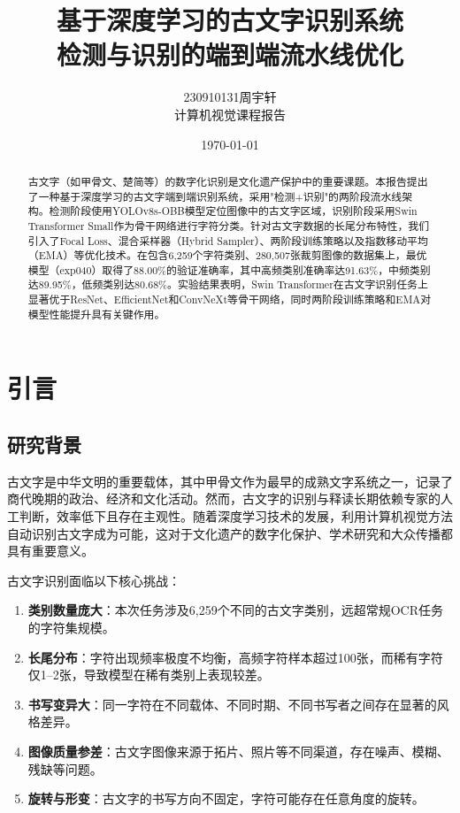 \documentclass[12pt,a4paper]{article}
\title{\textbf{基于深度学习的古文字识别系统} \\[0.5em] \large 检测与识别的端到端流水线优化}
\author{230910131\quad 周宇轩 \\ \small 计算机视觉课程报告}
\date{\today}
\begin{document}
\maketitle

\begin{abstract}
古文字（如甲骨文、楚简等）的数字化识别是文化遗产保护中的重要课题。本报告提出了一种基于深度学习的古文字端到端识别系统，采用"检测+识别"的两阶段流水线架构。检测阶段使用YOLOv8s-OBB模型定位图像中的古文字区域，识别阶段采用Swin Transformer Small作为骨干网络进行字符分类。针对古文字数据的长尾分布特性，我们引入了Focal Loss、混合采样器（Hybrid Sampler）、两阶段训练策略以及指数移动平均（EMA）等优化技术。在包含6,259个字符类别、280,507张裁剪图像的数据集上，最优模型（exp040）取得了88.00\%的验证准确率，其中高频类别准确率达91.63\%，中频类别达89.95\%，低频类别达80.68\%。实验结果表明，Swin Transformer在古文字识别任务上显著优于ResNet、EfficientNet和ConvNeXt等骨干网络，同时两阶段训练策略和EMA对模型性能提升具有关键作用。
\end{abstract}

\section{引言}

\subsection{研究背景}

古文字是中华文明的重要载体，其中甲骨文作为最早的成熟文字系统之一，记录了商代晚期的政治、经济和文化活动。然而，古文字的识别与释读长期依赖专家的人工判断，效率低下且存在主观性。随着深度学习技术的发展，利用计算机视觉方法自动识别古文字成为可能，这对于文化遗产的数字化保护、学术研究和大众传播都具有重要意义。

古文字识别面临以下核心挑战：
\begin{enumerate}
    \item \textbf{类别数量庞大}：本次任务涉及6,259个不同的古文字类别，远超常规OCR任务的字符集规模。
    \item \textbf{长尾分布}：字符出现频率极度不均衡，高频字符样本超过100张，而稀有字符仅1--2张，导致模型在稀有类别上表现较差。
    \item \textbf{书写变异大}：同一字符在不同载体、不同时期、不同书写者之间存在显著的风格差异。
    \item \textbf{图像质量参差}：古文字图像来源于拓片、照片等不同渠道，存在噪声、模糊、残缺等问题。
    \item \textbf{旋转与形变}：古文字的书写方向不固定，字符可能存在任意角度的旋转。
\end{enumerate}
\end{document}

